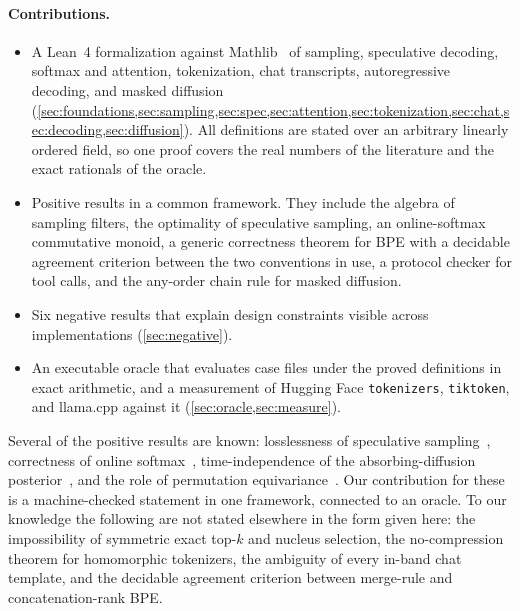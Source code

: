 \documentclass[10pt]{article}
\theoremstyle{qpt}
\begin{document}
\paragraph{Contributions.}
\begin{itemize}[leftmargin=*,itemsep=2pt]
\item A Lean~4 formalization against Mathlib~\cite{mathlib2020,demoura2021lean4}
  of sampling, speculative decoding, softmax and attention, tokenization, chat
  transcripts, autoregressive decoding, and masked diffusion
  (\cref{sec:foundations,sec:sampling,sec:spec,sec:attention,sec:tokenization,sec:chat,sec:decoding,sec:diffusion}).
  All definitions are stated over an arbitrary linearly ordered field, so one proof
  covers the real numbers of the literature and the exact rationals of the oracle.
\item Positive results in a common framework. They include the algebra of
  sampling filters, the optimality of speculative sampling, an online-softmax
  commutative monoid, a generic correctness theorem for BPE with a decidable
  agreement criterion between the two conventions in use, a protocol checker for
  tool calls, and the any-order chain rule for masked diffusion.
\item Six negative results that explain design constraints visible across
  implementations (\cref{sec:negative}).
\item An executable oracle that evaluates case files under the proved
  definitions in exact arithmetic, and a measurement of Hugging Face
  \texttt{tokenizers}, \texttt{tiktoken}, and llama.cpp against it (\cref{sec:oracle,sec:measure}).
\end{itemize}

Several of the positive results are known: losslessness of speculative
sampling~\cite{leviathan2023speculative,chen2023speculative}, correctness of online
softmax~\cite{milakov2018online,dao2022flashattention}, time-independence of the
absorbing-diffusion posterior~\cite{ou2025absorbing}, and the role of permutation
equivariance~\cite{yun2020universal}. Our contribution for these is a machine-checked
statement in one framework, connected to an oracle. To our knowledge the
following are not stated elsewhere in the form given here: the impossibility of
symmetric exact top-$k$ and nucleus selection, the no-compression theorem for
homomorphic tokenizers, the ambiguity of every in-band chat template, and the
decidable agreement criterion between merge-rule and concatenation-rank BPE.

\end{document}
